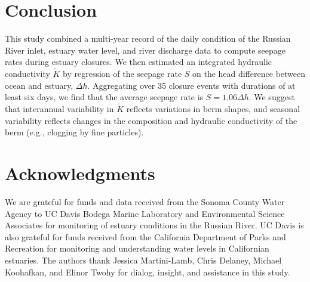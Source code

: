 \documentclass[preprint,12pt,authoryear]{elsarticle}
\begin{document}
\label{sec:discussion}

\section{Conclusion}

This study combined a multi-year record of the daily condition of the Russian River inlet, estuary water level, and river discharge data to compute seepage rates during estuary closures.
We then estimated an integrated hydraulic conductivity $\tilde K$ by regression of the seepage rate $S$ on the head difference between ocean and estuary, $\Delta h$. 
Aggregating over 35 closure events with durations of at least six days, we find that the average seepage rate is $S = 1.06 \Delta h$.
We suggest that interannual variability in $\tilde K$ reflects variations in berm shapes, and seasonal variability reflects changes in the composition and hydraulic conductivity of the berm (e.g., clogging by fine particles).

\section{Acknowledgments}
We are grateful for funds and data received from the Sonoma County Water Agency to UC Davis Bodega Marine Laboratory and Environmental Science Associates for monitoring of estuary conditions in the Russian River. UC Davis is also grateful for funds received from the California Department of Parks and Recreation for monitoring and understanding water levels in Californian estuaries. The authors thank Jessica Martini-Lamb, Chris Delaney, Michael Koohafkan, and Elinor Twohy for dialog, insight, and assistance in this study.
 
  
 
\end{document}
